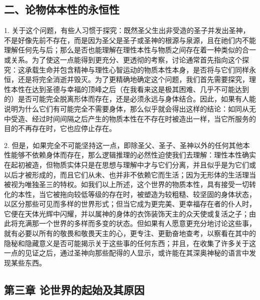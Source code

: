 
\subsection{二、论物体本性的永恒性}

1. 关于这个问题，有些人习惯于探究：既然圣父生出非受造的圣子并发出圣神，不是好像先前不存在，而是因为圣父是圣子或圣神的根源与泉源，且在祂们内不能理解任何先与后；那么是否也能理解在理性本性与物质之间存在着一种类似的合一或关系。为了使这一点能得到更充分、更透彻的考察，讨论通常首先指向这个探究：这承载生命并包含精神与理性心智运动的物质本性本身，是否将与它们同样永恒，还是将完全消逝并毁灭。为了更精确地确定这个问题，我们首先需要探究，理性本性在达到圣德与幸福的顶峰之后（在我看来这是极其困难、几乎不可能达到的）是否可能完全脱离形体而存在，还是必须永远与身体结合。因此，如果有人能说明为什么它们有可能完全不需要身体，那么似乎就会得出这样的结论：如同从无中受造、经过时间间隔之后产生的物质本性在不存在时被造出一样，当它所服务的目的不再存在时，它也应停止存在。\par

2. 但是，如果完全不可能坚持这一点，即除圣父、圣子、圣神以外的任何其他本性能够不依赖身体而存在，那么逻辑推理的必然性迫使我们去理解：理性本性确实在起初被造，但物质实体只是在思想与理解中才与它们分离，并且似乎是为它们或以后才被形成的，而且它们从未、也并非不依赖它而生活；因为无形体的生活理当被视为唯独圣三的特权。如我们以上所述，这个世界的物质本性，具有接受一切转化的本性，当它被拖向较低等级的存在时，被塑造为较粗糙、较坚固的身体状态，以区分那些可见而多样的世界形式；但当它成为更完美、更幸福存在者的仆人时，它便在天体光辉中闪耀，并以属神的身体的衣饰装饰天主的众天使或复活之子；由此将充满那一个世界的多样而多变的状态。但如果有人愿意更充分地讨论这些事，就有必要以所有的敬畏和敬畏天主的心，更专注、更勤奋地查考，以察看在其中的隐秘和隐藏意义是否可能揭示关于这些事的任何东西；并且，在收集了许多关于这一点的见证之后，通过圣神向那些配得的人显示，或许能在其深奥神秘的语言中发现某些东西。\par


\subsection{第三章 论世界的起始及其原因}

